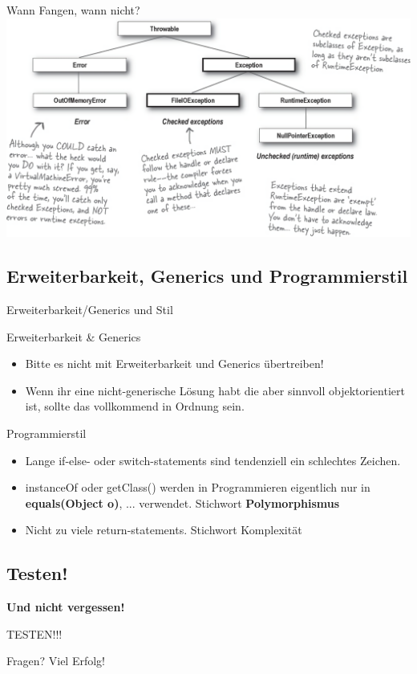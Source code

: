 \documentclass[aspectratio=169]{beamer}
\newcommand{\HUMONGOUS}{\Huge}
\begin{document}
\begin{frame}{Wann Fangen, wann nicht?}
  \includegraphics[scale=0.28]{../images/when_which_exception.png}
\end{frame}

\subsection{Erweiterbarkeit, Generics und Programmierstil}
\begin{frame}{Erweiterbarkeit/Generics und Stil}
  \begin{block}{Erweiterbarkeit \& Generics}
    \begin{itemize}
      \pause
      \item Bitte es nicht mit Erweiterbarkeit und Generics übertreiben!
      \pause
      \item Wenn ihr eine nicht-generische Lösung habt die aber sinnvoll objektorientiert ist, sollte das vollkommend in Ordnung sein.
    \end{itemize}
  \end{block}
  \pause
  \begin{block}{Programmierstil}
    \begin{itemize}
      \pause
      \item Lange \color{keywordcolor}if\color{FGround}-\color{keywordcolor}else\color{FGround}- oder \color{keywordcolor}switch\color{FGround}-statements
      sind tendenziell ein schlechtes Zeichen.
      \pause
      \item \color{keywordcolor}instanceOf \color{FGround} oder getClass() werden in Programmieren eigentlich nur in \textbf{equals(Object o)}, ... verwendet.
      Stichwort \textbf{Polymorphismus}
      \pause
      \item Nicht zu viele \color{keywordcolor}return\color{FGround}-statements. Stichwort Komplexität
    \end{itemize}
  \end{block}
\end{frame}

\subsection{Testen!}
\begin{frame}{\textbf{Und nicht vergessen!}}
  \pause
  \begin{center}\HUMONGOUS TESTEN!!! \end{center}
\end{frame}


\begin{frame}
  \begin{center}\HUMONGOUS Fragen?
    \pause
    \linebreak
    \linebreak
    Viel Erfolg!
  \end{center}
\end{frame}
\end{document}
